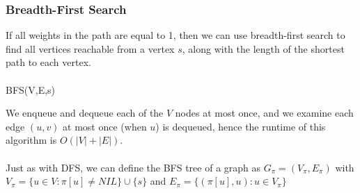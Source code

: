 \documentclass{article}
\begin{document}
        \subsubsection{Breadth-First Search}
            If all weights in the path are equal to 1, then we can use breadth-first search to find all vertices reachable from a vertex $s$, along with the length of the shortest path to each vertex. \\ \\
            BFS(V,E,s)
            \begin{algorithmic}[1]
                \EndFor
                        \EndIf
                    \EndFor
                \EndWhile
            \end{algorithmic}
            We enqueue and dequeue each of the $V$ nodes at most once, and we examine each edge $(u,v)$ at most once (when $u$) is dequeued, hence the runtime of this algorithm is $O(|V| + |E|)$. \\ \\
            Just as with DFS, we can define the BFS tree of a graph as $G_\pi = (V_\pi, E_\pi)$ with $V_\pi = \{ u \in V : \pi [u] \neq NIL \} \cup \{s\}$ and $E_\pi = \{ (\pi[u], u) : u \in V_\pi\}$
\end{document}
